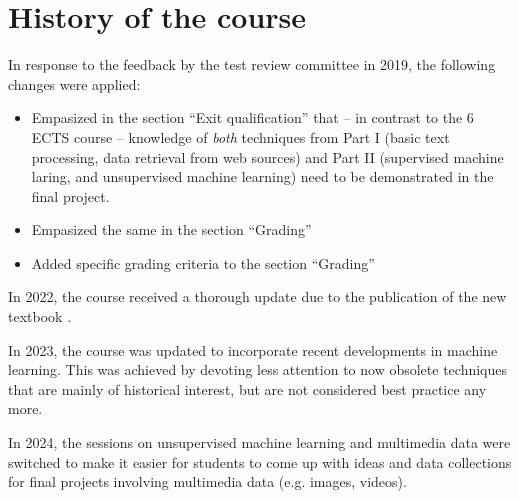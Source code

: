 \documentclass[a4paper,12pt]{report}
\begin{document}
\chapter{History of the course}
In response to the feedback by the test review committee in 2019, the following changes were applied:
\begin{itemize}
\item Empasized in the section ``Exit qualification'' that -- in contrast to the 6 ECTS course -- knowledge of \emph{both} techniques from Part I (basic text processing, data retrieval from web sources) and Part II (supervised machine laring, and unsupervised machine learning) need to be demonstrated in the final project.
\item Empasized the same in the section ``Grading''
\item Added specific grading criteria to the section ``Grading''
\end{itemize}

In 2022, the course received a thorough update due to the publication of the new textbook \citep{cssbook}.

In 2023, the course was updated to incorporate recent developments in machine learning. This was achieved by devoting less attention to now obsolete techniques that are mainly of historical interest, but are not considered best practice any more.

In 2024, the sessions on unsupervised machine learning and multimedia data were switched to make it easier for students to come up with ideas and data collections for final projects involving multimedia data (e.g. images, videos). 




 
 
 
\end{document}
